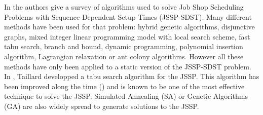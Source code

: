 \documentclass[a4paper,10pt]{article}
\begin{document}
In \cite{Allahverdi2008} the authors give a survey of algorithms used to solve Job Shop Scheduling Problems with Sequence Dependent Setup Times (JSSP-SDST). Many different methods have been used for that problem: hybrid genetic algorithms, disjunctive graphs, mixed integer linear programming model with local search scheme, fast tabu search, branch and bound, dynamic programming, polynomial insertion algorithm, Lagrangian relaxation or ant colony algorithms. However all these methods have only been applied to a static version of the JSSP-SDST problem. In \cite{Taillard1994}, Taillard developped a tabu search algorithm for the JSSP. This algorithm has been improved along the time (\cite{Blazewicz1996, Watson2003}) and is known to be one of the most effective technique to solve the JSSP. Simulated Annealing (SA) or Genetic Algorithms (GA) are also widely spread to generate solutions to the JSSP.\\%

%



\end{document}
